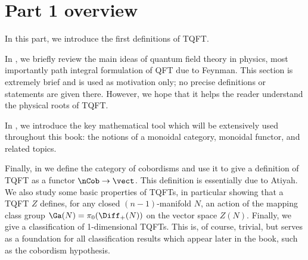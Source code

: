\chapter*{Part 1 overview}%
In this part, we introduce the first definitions
of TQFT.

In , we briefly review the main ideas of quantum
field theory in physics, most importantly path integral formulation of QFT due
to Feynman. This section is extremely brief and is used as motivation only; no
precise definitions or statements are given there. However, we hope that it
helps the reader understand the physical roots of TQFT.

In , we introduce the key mathematical tool which will be
extensively used throughout this book: the notions of a monoidal category,
monoidal functor, and related topics.

Finally, in  we define the category of cobordisms and use it
to give a definition of TQFT as a functor $\nCob\to \vect$. This definition is
essentially due to Atiyah. We also study some basic properties of TQFTs, in
particular showing that a TQFT $Z$ defines, for any closed $(n-1)$-manifold $N$,
an action of the mapping class group $\Ga(N)=\pi_0(\Diff_+(N))$ on
the vector space $Z(N)$. Finally, we give a classification of 1-dimensional
TQFTs. This is, of course, trivial, but serves as a foundation for all
classification results which appear later in the book, such as the cobordism
hypothesis.